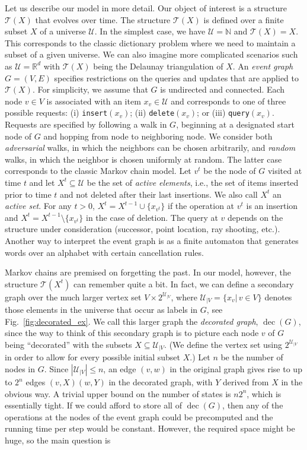 \documentclass[oribibl,envcountsect,envcountsame]{llncs}
\DeclareMathOperator{\dec}{dec}
\newcommand{\U}{\mathcal U}
\newcommand{\R}{\mathbb R}
\newcommand{\N}{\mathbb N}
\begin{document}
Let us describe our model in more detail.
Our object of interest is a structure $\mathcal{T}(X)$ that evolves
over time. The structure $\mathcal{T}(X)$ is defined over a
finite subset $X$ of a universe $\U$.
In the simplest case, we have $\U = \N$  and 
$\mathcal{T}(X) = X$. This corresponds to the classic
dictionary problem where we need to maintain a subset of a 
given universe. We can also imagine more complicated 
scenarios such as $\U = \R^d$ with 
$\mathcal{T}(X)$ being the Delaunay triangulation of $X$.
An \emph{event graph} $G= (V,E)$ specifies restrictions
on the queries and updates that are applied to $\mathcal{T}(X)$.
For simplicity, we assume that $G$ is undirected and connected.
Each node $v \in V$ is associated with an item $x_v\in \U$
and corresponds to one of three possible requests:
(i) \texttt{insert}$(x_v)$;
(ii) \texttt{delete}$(x_v)$; or
(iii) \texttt{query}$(x_v)$.
Requests are specified by following a walk in $G$,
beginning at a designated start node of $G$ and hopping
from node to neighboring node. We consider both \emph{adversarial}
walks, in which the neighbors can be chosen arbitrarily, and
\emph{random} walks, in which the neighbor is chosen uniformly at random.
The latter case corresponds to the classic Markov chain model. 
Let $v^t$ be the node of $G$ visited at time $t$ and 
let $X^{t}\subseteq \U$ be the set of \emph{active elements},
i.e., the set of items inserted prior to time $t$ 
and not deleted after their last insertions.
We also call $X^{t}$ an \emph{active set}.
For any $t>0$, $X^{t}= X^{t-1}\cup \{x_{v^t}\}$
if the operation at $v^t$ is an insertion and
$X^{t}= X^{t-1}\setminus \{x_{v^t}\}$ in the case of deletion.
The query at $v$ depends on the structure under consideration
(successor, point location, ray shooting, etc.).
Another way to interpret the event graph is as a 
finite automaton that generates words over an alphabet with 
certain cancellation rules.

Markov chains are premised on forgetting the past.
In our model, however, the structure
$\mathcal{T}(X^{t})$ can remember quite a bit. In fact, we can
define a secondary graph over the much larger
vertex set $V\times 2^{\U_{|V}}$, 
where $\U_{|V} = \{x_v|\, v\in V\}$ denotes those 
elements in the universe that occur as labels in $G$, see Fig.~\ref{fig:decorated_ex}. 
We call this larger graph the \emph{decorated graph},
$\dec(G)$, since the way to think of this
secondary graph is to picture each node $v$ of $G$ being
``decorated'' with the subsets $X \subseteq \U_{|V}$. 
(We define the vertex set using $2^{\U_{|V}}$
in order to allow for every possible initial subset $X$.)
Let $n$
be the number of nodes in $G$. Since $|\U_{|V}| \leq n$, an edge $(v,w)$
in the original graph gives rise to up to $2^n$ edges 
$(v,X)(w,Y)$ in the decorated graph, 
with $Y$ derived from $X$ in the obvious way.
A trivial upper bound on the number of states is $n2^n$, which is
essentially tight.
If we could afford to store all of $\dec(G)$,
then any of the operations at the nodes of the
event graph could be precomputed and the running time per step would be constant.
However, the required space might be huge,
so the main question is 
\end{document}
